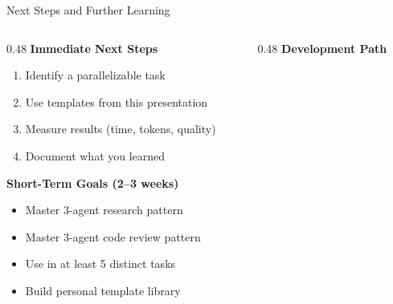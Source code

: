 \documentclass[aspectratio=169,11pt]{beamer}
\begin{document}
\begin{frame}{Next Steps and Further Learning}
    \begin{columns}[T]
        \begin{column}{0.48\textwidth}
            \textbf{Immediate Next Steps}
            \begin{enumerate}
                \footnotesize
                \item Identify a parallelizable task
                \item Use templates from this presentation
                \item Measure results (time, tokens, quality)
                \item Document what you learned
            \end{enumerate}

            \vspace{0.3cm}
            \textbf{Short-Term Goals (2--3 weeks)}
            \begin{itemize}
                \footnotesize
                \item Master 3-agent research pattern
                \item Master 3-agent code review pattern
                \item Use in at least 5 distinct tasks
                \item Build personal template library
            \end{itemize}
        \end{column}
        \begin{column}{0.48\textwidth}
            \textbf{Development Path}

\end{column}
\end{columns}
\end{frame}
\end{document}

